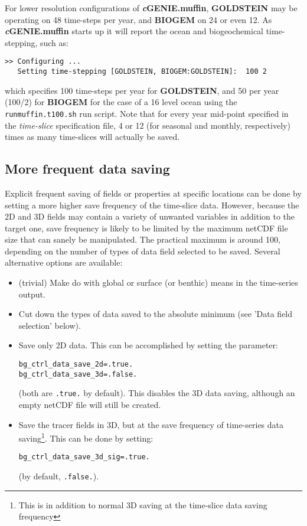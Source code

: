 \documentclass[11pt,fleqn]{book} %
\begin{document}
For lower resolution configurations of \textbf{\textit{c}GENIE.muffin}, \textbf{GOLDSTEIN} may be operating on 48 time-steps per year, and \textbf{BIOGEM} on 24 or even 12. As \textbf{\textit{c}GENIE.muffin} starts up it will report the ocean and biogeochemical time-stepping, such as:
\small\begin{verbatim}
>> Configuring ...
   Setting time-stepping [GOLDSTEIN, BIOGEM:GOLDSTEIN]:  100 2
\end{verbatim}\normalsize
which specifies 100 time-steps per year for \textbf{GOLDSTEIN}, and 50 per year (100/2) for \textbf{BIOGEM} for the case of a 16 level ocean using the \texttt{runmuffin.t100.sh} run script.
Note that for every year mid-point specified in the\textit{ time-slice} specification file, 4 or 12 (for seasonal and monthly, respectively) times as many time-slices will actually be saved.

%
\subsection{More frequent data saving}

Explicit frequent saving of fields or properties at specific locations can be done by setting a more higher save frequency of the time-slice data. However, because the 2D and 3D fields may contain a variety of unwanted variables in addition to the target one, save frequency is likely to be limited by the maximum netCDF file size that can sanely be manipulated. The practical maximum is around 100, depending on the number of types of data field selected to be saved. Several alternative options are available:

\begin{itemize}
\item (trivial) Make do with global or surface (or benthic) means in the time-series output.
\item Cut down the types of data saved to the absolute minimum (see 'Data field selection' below).
\item Save only 2D data. This can be accomplished by setting the parameter:
\vspace{-1mm}\begin{verbatim}
bg_ctrl_data_save_2d=.true.
bg_ctrl_data_save_3d=.false.
\end{verbatim}\vspace{-1mm}
(both are \texttt{.true.} by default). This disables the 3D data saving, although an empty netCDF file will still be created.
\item Save the tracer fields in 3D, but at the save frequency of time-series data saving\footnote{This is in addition to normal 3D saving at the time-slice data saving frequency}. This can be done by setting:
\vspace{-1mm}\begin{verbatim}
bg_ctrl_data_save_3d_sig=.true.
\end{verbatim}\vspace{-1mm}
(by default, \texttt{.false.}).
\end{itemize}
\end{document}
